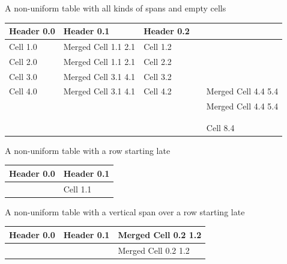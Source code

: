 \documentclass[11pt,a4paper]{article}
\begin{document}
A non-uniform table with all kinds of spans and empty cells

\begin{table}[h]
\begin{tabular}{|l|l|l|l|l|}
\hline
Header 0.0 & Header 0.1 & Header 0.2 &  &  \\ \hline
Cell 1.0 & Merged Cell 1.1 2.1 & Cell 1.2 &  &  \\ \hline
Cell 2.0 & Merged Cell 1.1 2.1 & Cell 2.2 &  &  \\ \hline
Cell 3.0 & Merged Cell 3.1 4.1 & Cell 3.2 &  &  \\ \hline
Cell 4.0 & Merged Cell 3.1 4.1 & Cell 4.2 &  & Merged Cell 4.4 5.4 \\ \hline
 &  &  &  & Merged Cell 4.4 5.4 \\ \hline
 &  &  &  &  \\ \hline
 &  &  &  &  \\ \hline
 &  &  &  & Cell 8.4 \\ \hline
\end{tabular}
\end{table}

A non-uniform table with a row starting late

\begin{table}[h]
\begin{tabular}{|l|l|}
\hline
Header 0.0 & Header 0.1 \\ \hline
 & Cell 1.1 \\ \hline
\end{tabular}
\end{table}

A non-uniform table with a vertical span over a row starting late

\begin{table}[h]
\begin{tabular}{|l|l|l|}
\hline
Header 0.0 & Header 0.1 & Merged Cell 0.2 1.2 \\ \hline
 &  & Merged Cell 0.2 1.2 \\ \hline
\end{tabular}
\end{table}
\end{document}
